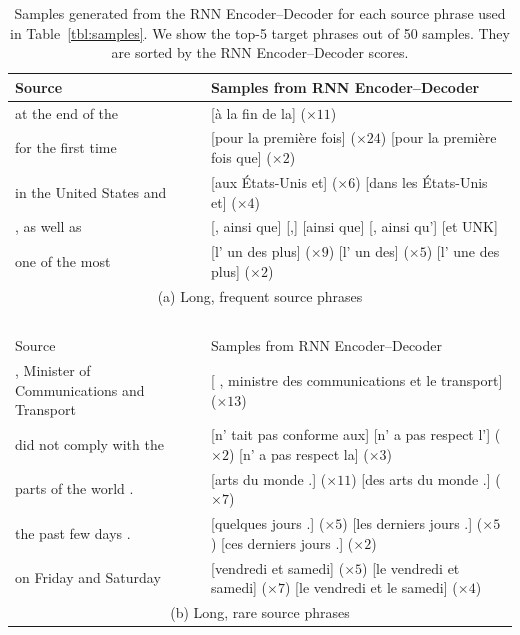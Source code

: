 \begin{table}[t]
    \centering
    \small
    \begin{tabular}{p{} | p{}}
        \hline
        Source & Samples from RNN Encoder--Decoder \\
        \hline\hline
        at the end of the & 
        [à la fin de la] ($\times 11$)
        \\
        \hline
        for the first time &
        [pour la première fois] ($\times 24$) [pour la première fois que] ($\times 2$)
        \\
        \hline
        in the United States and
        &
        [aux États-Unis et] ($\times 6$) [dans les États-Unis et] ($\times 4$)
        \\
        \hline
        , as well as
        &
        [, ainsi que] [,] [ainsi que] [, ainsi qu'] [et UNK]
        \\
        \hline
        one of the most
        &
        [l' un des plus] ($\times 9$) [l' un des] ($\times 5$) [l' une des plus] ($\times 2$)
        \\
        \hline
        \multicolumn{2}{c}{(a) Long, frequent source phrases}\\
        \multicolumn{2}{c}{~}\\
        \hline
        Source & Samples from RNN Encoder--Decoder \\
        \hline\hline
        , Minister of Communications and Transport &
[ , ministre des communications et le transport] ($\times 13$) 
        \\
        \hline
        did not comply with the
        &
        [n' tait pas conforme aux] [n' a pas respect l'] ($\times 2$) [n' a pas respect la] ($\times 3$)
        \\
        \hline
        parts of the world .
        &
        [arts du monde .] ($\times 11$) [des arts du monde .] ($\times 7$)
        \\
        \hline
        the past few days .
        &
        [quelques jours .] ($\times 5$) [les derniers jours .] ($\times 5$) [ces derniers jours .] ($\times 2$)
        \\
        \hline
on Friday and Saturday
        &
        [vendredi et samedi] ($\times 5$) [le vendredi et samedi] ($\times 7$) [le vendredi et le samedi] ($\times 4$)
        \\
        \hline
        \multicolumn{2}{c}{(b) Long, rare source phrases}\\
    \end{tabular}
    \caption{Samples generated from the RNN Encoder--Decoder for each source
        phrase used in Table~\mbox{\ref{tbl:samples}}. We show the top-5 target phrases
    out of 50 samples.  They are sorted by the RNN Encoder--Decoder scores.}
\label{tbl:samples_generated}
    \vspace{-3mm}
\end{table}

